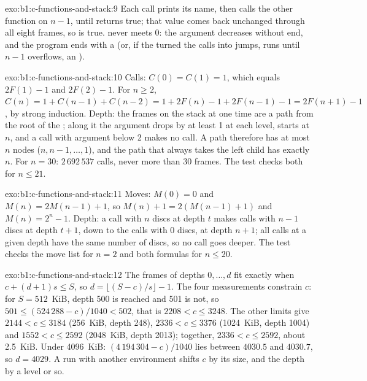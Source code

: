 \begin{solution}{exo:b1:c-functions-and-stack:9}
Each call prints its name, then calls the other function on $n - 1$, until  returns true; that
value comes back unchanged through all eight frames, so  is true.
 never meets 0: the argument decreases without end, and the program ends with a  (or,
if the  turned the calls into jumps, runs until $n - 1$ overflows, an ).
\end{solution}

\begin{solution}{exo:b1:c-functions-and-stack:10}
Calls: $C(0) = C(1) = 1$, which equals $2F(1) - 1$ and $2F(2) - 1$. For $n \geq 2$, $C(n) = 1 + C(n-1) + C(n-2) =
1 + 2F(n) - 1 + 2F(n-1) - 1 = 2F(n+1) - 1$, by strong induction. Depth: the frames on the stack at one time are a
path from the root of the ; along it the argument drops by at least 1 at each level, starts at
$n$, and a call with argument below 2 makes no call. A path therefore has at most $n$ nodes ($n, n-1, \dots, 1$),
and the path that always takes the left child has exactly $n$. For $n = 30$: $2\,692\,537$ calls, never more than
30 frames. The test  checks both for $n \leq 21$.
\end{solution}

\begin{solution}{exo:b1:c-functions-and-stack:11}
Moves: $M(0) = 0$ and $M(n) = 2M(n-1) + 1$, so $M(n) + 1 = 2(M(n-1) + 1)$ and $M(n) = 2^n - 1$. Depth: a call with
$n$ discs at depth $t$ makes calls with $n - 1$ discs at depth $t + 1$, down to the calls with 0 discs, at depth
$n + 1$; all calls at a given depth have the same number of discs, so no call goes deeper. The test
 checks the move list for $n = 2$ and both formulas for $n \leq 20$.
\end{solution}

\begin{solution}{exo:b1:c-functions-and-stack:12}
The frames of depths $0, \dots, d$ fit exactly when $c + (d + 1)s \leq S$, so $d = \lfloor (S - c)/s \rfloor - 1$.
The four measurements constrain $c$: for $S = 512$~KiB, depth 500 is reached and 501 is not, so
$501 \leq (524\,288 - c)/1040 < 502$, that is $2208 < c \leq 3248$. The other limits give $2144 < c \leq 3184$
(256~KiB, depth 248), $2336 < c \leq 3376$ (1024~KiB, depth 1004) and $1552 < c \leq 2592$ (2048~KiB, depth 2013);
together, $2336 < c \leq 2592$, about 2.5~KiB. Under 4096~KiB: $(4\,194\,304 - c)/1040$ lies between $4030.5$ and
$4030.7$, so $d = 4029$. A run with another environment shifts $c$ by its size, and the depth by a level or so.
\end{solution}

